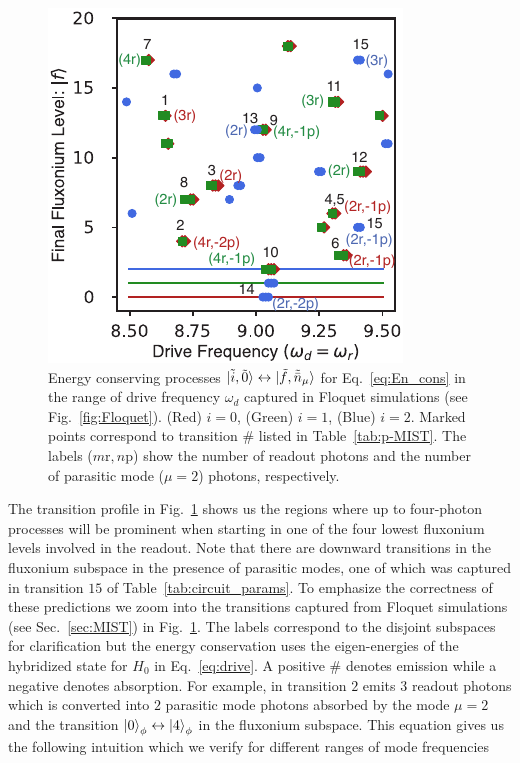 \documentclass[%
reprint,
superscriptaddress,
 amsmath,amssymb,
 aps,
 prx,
longbibliography,
floatfix,
]{revtex4-2}
\begin{document}
\begin{figure}[!htb]
    \centering
    \includegraphics[width=\linewidth]{Figures/Trans_.pdf}
    \caption{Energy conserving processes $\ket{\tilde{i},\tilde{0}}\leftrightarrow\ket{\tilde{f},\tilde{\bar n}_\mu}$ for Eq.~\ref{eq:En_cons} in the range of drive frequency $\omega_d$ captured in Floquet simulations (see Fig.~\ref{fig:Floquet}). (Red) $i=0$, (Green) $i=1$, (Blue) $i=2$. Marked points correspond to transition # listed in Table~\ref{tab:p-MIST}. The labels ($m\text{r},n\text{p}$) show the number of readout photons and the number of parasitic mode ($\mu=2$) photons, respectively.}
    \label{fig:trans_prof}
\end{figure}

The transition profile in Fig.~\ref{fig:trans_prof} shows us the regions where up to four-photon processes will be prominent when starting in one of the four lowest fluxonium levels involved in the readout. Note that there are downward transitions in the fluxonium subspace in the presence of parasitic modes, one of which was captured in transition $15$ of Table~\ref{tab:circuit_params}. To emphasize the correctness of these predictions we zoom into the transitions captured from Floquet simulations (see Sec.~\ref{sec:MIST}) in Fig.~\ref{fig:trans_prof}. The labels correspond to the disjoint subspaces for clarification but the energy conservation uses the eigen-energies of the hybridized state for $H_{0}$ in Eq.~\ref{eq:drive}. A positive $\#$ denotes emission while a negative denotes absorption. For example, in transition $2$ emits $3$ readout photons which is converted into $2$ parasitic mode photons absorbed by the mode $\mu=2$ and the transition $\ket{0}_\phi\leftrightarrow \ket{4}_\phi$ in the fluxonium subspace. This equation gives us the following intuition which we verify for different ranges of mode frequencies
\end{document}
